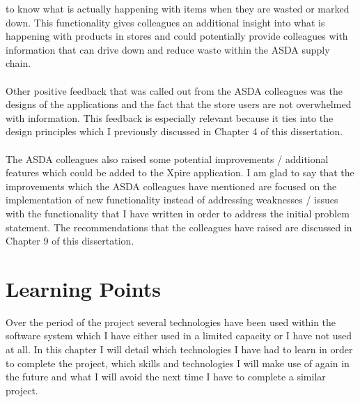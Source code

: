 \documentclass[a4paper,11pt]{report}
\begin{document}
to know what is actually happening with items when they are wasted or marked down. 
This functionality gives colleagues an additional insight into what is happening with products in stores and could potentially provide colleagues with information that can drive down and reduce waste within the ASDA supply chain. 
\\
\\
Other positive feedback that was called out from the ASDA colleagues was the designs of the applications and the fact that the store users are not overwhelmed with information. 
This feedback is especially relevant because it ties into the design principles which I previously discussed in Chapter 4 of this dissertation. 
\\
\\
The ASDA colleagues also raised some potential improvements / additional features which could be added to the Xpire application. I am glad to say that the improvements which the ASDA colleagues have mentioned are focused on the implementation of new functionality instead of addressing weaknesses / issues with the functionality that I have written in order to address the initial problem statement. The recommendations that the colleagues have raised are discussed in Chapter 9 of this dissertation.

\chapter{Learning Points}
Over the period of the project several technologies have been used within the software system
which I have either used in a limited capacity or I have not used at all. In this chapter I will
detail which technologies I have had to learn in order to complete the project, which skills and 
technologies I will make use of again in the future and what I will avoid the next time I have to 
complete a similar project.

\end{document}
